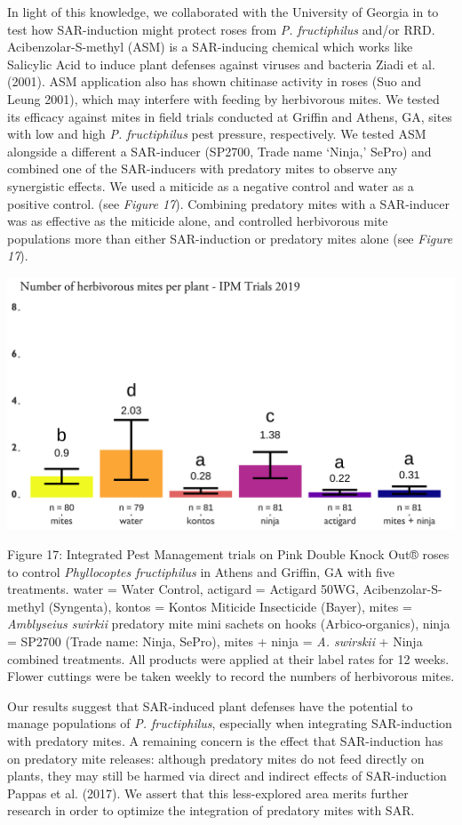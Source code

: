 \documentclass[12pt,final,CPage]{ufthesis}
\begin{document}
{  In light of this knowledge, we collaborated with the University of Georgia in to test how SAR-induction might protect roses from \emph{P. fructiphilus} and/or RRD. Acibenzolar-S-methyl (ASM) is a SAR-inducing chemical which works like Salicylic Acid to induce plant defenses against viruses and bacteria Ziadi et al. (2001). ASM application also has shown chitinase activity in roses (Suo and Leung 2001), which may interfere with feeding by herbivorous mites. We tested its efficacy against mites in field trials conducted at Griffin and Athens, GA, sites with low and high \emph{P. fructiphilus} pest pressure, respectively. We tested ASM alongside a different a SAR-inducer (SP2700, Trade name `Ninja,' SePro) and combined one of the SAR-inducers with predatory mites to observe any synergistic effects. We used a miticide as a negative control and water as a positive control. (see \emph{Figure 17}). Combining predatory mites with a SAR-inducer was as effective as the miticide alone, and controlled herbivorous mite populations more than either SAR-induction or predatory mites alone (see \emph{Figure 17}).
  \begin{center}\includegraphics[width=0.8\linewidth]{figure/ipm_graph} \end{center}

  Figure 17: Integrated Pest Management trials on Pink Double Knock Out® roses to control \emph{Phyllocoptes fructiphilus} in Athens and Griffin, GA with five treatments. water = Water Control, actigard = Actigard 50WG, Acibenzolar-S-methyl (Syngenta), kontos = Kontos Miticide Insecticide (Bayer), mites = \emph{Amblyseius swirkii} predatory mite mini sachets on hooks (Arbico-organics), ninja = SP2700 (Trade name: Ninja, SePro), mites + ninja = \emph{A. swirskii} + Ninja combined treatments. All products were applied at their label rates for 12 weeks. Flower cuttings were be taken weekly to record the numbers of herbivorous mites.

  Our results suggest that SAR-induced plant defenses have the potential to manage populations of \emph{P. fructiphilus}, especially when integrating SAR-induction with predatory mites. A remaining concern is the effect that SAR-induction has on predatory mite releases: although predatory mites do not feed directly on plants, they may still be harmed via direct and indirect effects of SAR-induction Pappas et al. (2017). We assert that this less-explored area merits further research in order to optimize the integration of predatory mites with SAR.

}
\end{document}
